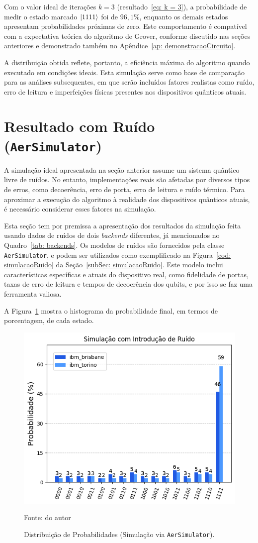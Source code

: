 Com o valor ideal de iterações $k=3$ (resultado~\ref{eq: k = 3}), a probabilidade de medir o estado marcado $\ket{1111}$ foi de $96,1\%$, enquanto os demais estados apresentam probabilidades próximas de zero. Este comportamento é compatível com a expectativa teórica do algoritmo de Grover, conforme discutido nas seções anteriores e demonstrado também no Apêndice~\ref{ap: demonstracaoCircuito}.

A distribuição obtida reflete, portanto, a eficiência máxima do algoritmo quando executado em condições ideais. Esta simulação serve como base de comparação para as análises subsequentes, em que serão incluídos fatores realistas como ruído, erro de leitura e imperfeições físicas presentes nos dispositivos quânticos atuais.

\section{Resultado com Ruído (\texttt{AerSimulator})}
\label{sec: resultRuido}

A simulação ideal apresentada na seção anterior assume um sistema quântico livre de ruídos. No entanto, implementações reais são afetadas por diversos tipos de erros, como decoerência, erro de porta, erro de leitura e ruído térmico. Para aproximar a execução do algoritmo à realidade dos dispositivos quânticos atuais, é necessário considerar esses fatores na simulação.

Esta seção tem por premissa a apresentação dos resultados da simulação feita usando dados de ruídos de dois \textit{backends} diferentes, já mencionados no Quadro~\ref{tab: backends}. Os modelos de ruídos são fornecidos pela classe \texttt{AerSimulator}, e podem ser utilizados como exemplificado na Figura~\ref{cod: simulacaoRuido} da Seção~\ref{subSec: simulacaoRuido}. Este modelo inclui características específicas e atuais do dispositivo real, como fidelidade de portas, taxas de erro de leitura e tempos de decoerência dos qubits, e por isso se faz uma ferramenta valiosa.

A Figura~\ref{fig: resultRuido} mostra o histograma da probabilidade final, em termos de porcentagem, de cada estado.

\begin{figure}[ht!]
    \centering
    \captionsetup{justification=centering}
    \caption{Distribuição de Probabilidades (Simulação via \texttt{AerSimulator}).}
    \label{fig: resultRuido}
    \includegraphics[width=.5\linewidth]{Imagens/resultRuido.png}    
    
    {\small Fonte: do autor} 
\end{figure}

